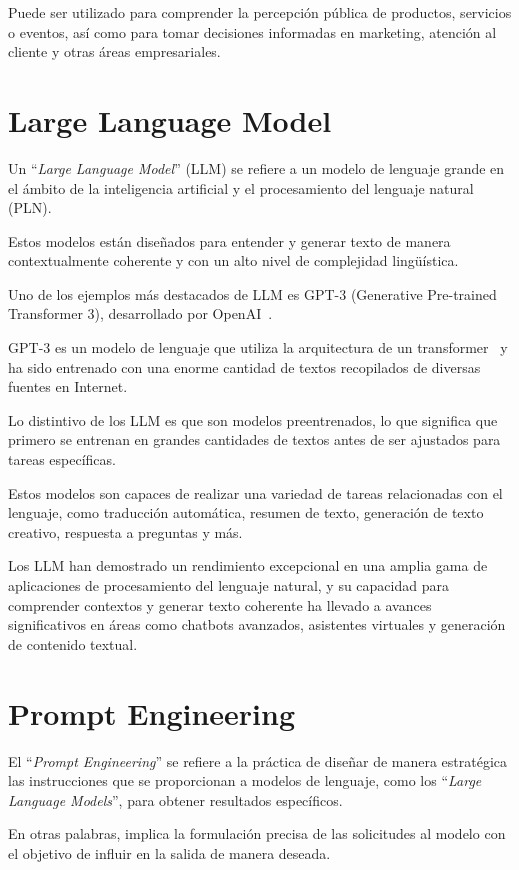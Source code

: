 Puede ser utilizado para comprender la percepción pública 
de productos, servicios o eventos, así como para tomar 
decisiones informadas en marketing, atención al cliente y 
otras áreas empresariales.


\section{Large Language Model}
Un ``\emph{Large Language Model}'' (LLM) se refiere a un modelo de lenguaje grande en el ámbito 
de la inteligencia artificial y el procesamiento del lenguaje natural (PLN). 

Estos modelos están diseñados para entender y generar texto de manera contextualmente coherente y 
con un alto nivel de complejidad lingüística.

Uno de los ejemplos más destacados de LLM es GPT-3 
(Generative Pre-trained Transformer 3), desarrollado por OpenAI~\cite{chatgpt1}. 

GPT-3 es un modelo de lenguaje que utiliza la arquitectura de un transformer~\cite{UrdanetaTransformers} 
y ha sido entrenado con una enorme cantidad de textos recopilados de diversas fuentes en Internet.

Lo distintivo de los LLM es que son modelos preentrenados, 
lo que significa que primero se entrenan en grandes cantidades 
de textos antes de ser ajustados para tareas específicas. 

Estos modelos son capaces de realizar una variedad de tareas relacionadas con el lenguaje, como traducción automática, resumen de texto, generación de texto creativo, respuesta a preguntas y más.

Los LLM han demostrado un rendimiento excepcional en una amplia gama de aplicaciones de procesamiento del lenguaje natural, y su capacidad para comprender contextos y generar texto coherente ha llevado a avances significativos en áreas como chatbots avanzados, asistentes virtuales y generación de contenido textual.

\section{Prompt Engineering}
El ``\emph{Prompt Engineering}'' se refiere a la práctica de diseñar de manera
 estratégica las instrucciones que se proporcionan a modelos de lenguaje, 
 como los ``\emph{Large Language Models}'', para obtener resultados específicos. 

En otras palabras, implica la formulación precisa de las solicitudes al modelo 
con el objetivo de influir en la salida de manera deseada.

